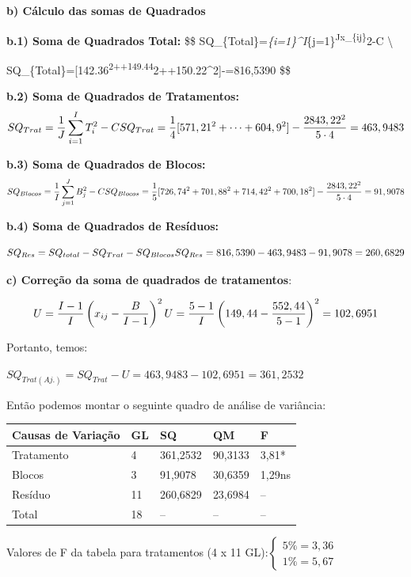 \documentclass[
]{book}
\begin{document}
\textbf{b) Cálculo das somas de Quadrados}

\textbf{b.1) Soma de Quadrados Total:}
\$\$
SQ\_\{Total\}=\sum\emph{\{i=1\}\^{}I\sum}\{j=1\}\textsuperscript{Jx\_\{ij\}}2-C \textbackslash{}

SQ\_\{Total\}={[}142.36\textsuperscript{2+\cdots+149.44}2+\cdots+150.22\^{}2{]}-=816,5390
\$\$

\textbf{b.2) Soma de Quadrados de Tratamentos:}
\[
SQ_{Trat}=\frac{1}{J}\sum_{i=1}^IT_{i}^2-C \\
SQ_{Trat}=\frac{1}{4}[571,21^2+\cdots+604,9^2]-\frac{2843,22^2}{5\cdot4}=463,9483
\]

\textbf{b.3) Soma de Quadrados de Blocos:}
\[
SQ_{Blocos}=\frac{1}{I}\sum_{j=1}^JB_{j}^2-C \\
SQ_{Blocos}=\frac{1}{5}[726,74^2+701,88^2+714,42^2+700,18^2]-\frac{2843,22^2}{5\cdot4}=91,9078
\]

\textbf{b.4) Soma de Quadrados de Resíduos:}

\[
SQ_{Res}=SQ_{total}-SQ_{Trat}-SQ_{Blocos} \\
SQ_{Res}=816,5390-463,9483-91,9078=260,6829
\]

\textbf{c) Correção da soma de quadrados de tratamentos}:

\[
U=\frac{I-1}{I}\left(x_{ij}-\frac{B}{I-1}\right)^2 \\
U=\frac{5-1}{I}\left(149,44-\frac{552,44}{5-1}\right)^2=102,6951
\]

Portanto, temos:

\(SQ_{Trat(Aj.)}=SQ_{Trat}-U=463,9483-102,6951=361,2532\)

Então podemos montar o seguinte quadro de análise de variância:

\begin{table}[H]
\centering
\begin{tabular}{l|l|l|l|l}
\hline
Causas de Variação & GL & SQ & QM & F\\
\hline
Tratamento & 4 & 361,2532 & 90,3133 & 3,81*\\
\hline
Blocos & 3 & 91,9078 & 30,6359 & 1,29ns\\
\hline
Resíduo & 11 & 260,6829 & 23,6984 & --\\
\hline
Total & 18 & -- & -- & --\\
\hline
\end{tabular}
\end{table}

Valores de F da tabela para tratamentos (4 x 11 GL):\(\begin{cases} 5\%=3,36 \\ 1\%=5,67 \end{cases}\)
\end{document}

